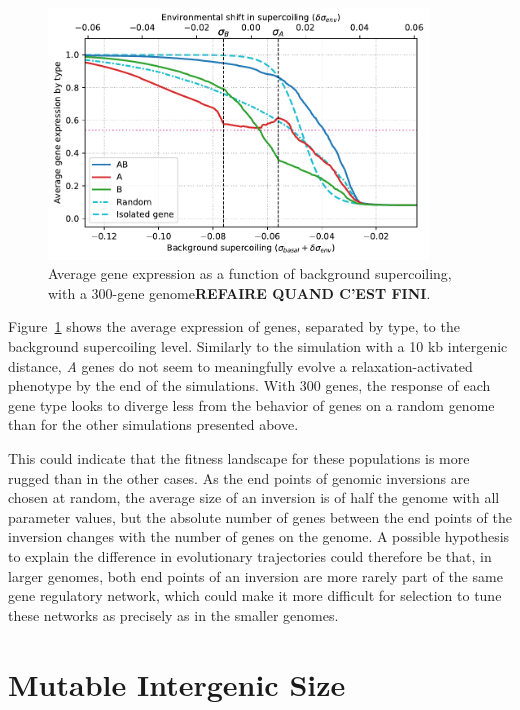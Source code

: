 \begin{figure}[H]
\centering
\includegraphics[width=0.9\textwidth]{param/300-genes/activity_sigmas_avg.pdf}
\caption[Average gene expression as a function of background supercoiling, with a 300-gene genome]{Average gene expression as a function of background supercoiling, with a 300-gene genome\textbf{REFAIRE QUAND C'EST FINI}.}
\label{fig:param:300genes-activ-by-sigma}
\end{figure}

Figure~\ref{fig:param:300genes-activ-by-sigma} shows the average expression of genes, separated by type, to the background supercoiling level.
Similarly to the simulation with a 10 kb intergenic distance, \emph{A} genes do not seem to meaningfully evolve a relaxation-activated phenotype by the end of the simulations.
With 300 genes, the response of each gene type looks to diverge less from the behavior of genes on a random genome than for the other simulations presented above.

This could indicate that the fitness landscape for these populations is more rugged than in the other cases.
As the end points of genomic inversions are chosen at random, the average size of an inversion is of half the genome with all parameter values, but the absolute number of genes between the end points of the inversion changes with the number of genes on the genome.
A possible hypothesis to explain the difference in evolutionary trajectories could therefore be that, in larger genomes, both end points of an inversion are more rarely part of the same gene regulatory network, which could make it more difficult for selection to tune these networks as precisely as in the smaller genomes.


\FloatBlock

\section{Mutable Intergenic Size}


